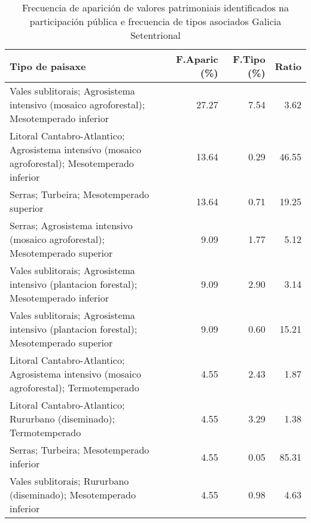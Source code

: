 \begin{table}[p]
\centering
\caption{Frecuencia de aparición de valores patrimoniais identificados na participación pública e frecuencia de tipos asociados Galicia Setentrional} 
\label{vsixotpat10}
\begin{tabular}{lrrr}
  \hline
Tipo de paisaxe & F.Aparic (\%) & F.Tipo (\%) & Ratio \\ 
  \hline
Vales sublitorais; Agrosistema intensivo (mosaico agroforestal); Mesotemperado inferior & 27.27 & 7.54 & 3.62 \\ 
  Litoral Cantabro-Atlantico; Agrosistema intensivo (mosaico agroforestal); Mesotemperado inferior & 13.64 & 0.29 & 46.55 \\ 
  Serras; Turbeira; Mesotemperado superior & 13.64 & 0.71 & 19.25 \\ 
  Serras; Agrosistema intensivo (mosaico agroforestal); Mesotemperado superior & 9.09 & 1.77 & 5.12 \\ 
  Vales sublitorais; Agrosistema intensivo (plantacion forestal); Mesotemperado inferior & 9.09 & 2.90 & 3.14 \\ 
  Vales sublitorais; Agrosistema intensivo (plantacion forestal); Mesotemperado superior & 9.09 & 0.60 & 15.21 \\ 
  Litoral Cantabro-Atlantico; Agrosistema intensivo (mosaico agroforestal); Termotemperado & 4.55 & 2.43 & 1.87 \\ 
  Litoral Cantabro-Atlantico; Rururbano (diseminado); Termotemperado & 4.55 & 3.29 & 1.38 \\ 
  Serras; Turbeira; Mesotemperado inferior & 4.55 & 0.05 & 85.31 \\ 
  Vales sublitorais; Rururbano (diseminado); Mesotemperado inferior & 4.55 & 0.98 & 4.63 \\ 
   \hline
\end{tabular}
\end{table}
